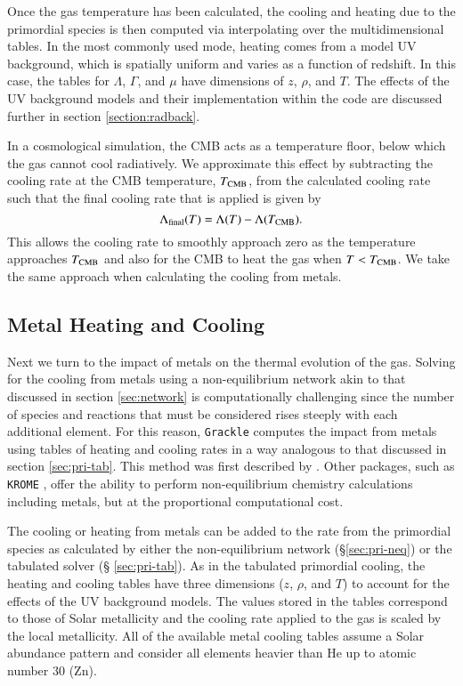 Once the gas temperature has been calculated, the cooling and heating
due to the primordial species is then computed via interpolating over
the multidimensional tables.  In the most commonly used mode, heating
comes from a model UV background, which is spatially uniform and
varies as a function of redshift.  In this case, the tables for
$\Lambda$, $\Gamma$, and $\mu$ have dimensions of $z$, $\rho$, and
$T$.  The effects of the UV background models and their implementation
within the code are discussed further in section
\ref{section:radback}.

In a cosmological simulation, the CMB acts as a temperature floor,
below which the gas cannot cool radiatively.  We approximate this effect by
subtracting the cooling rate at the CMB temperature, $T_{\rm CMB}$, from
the calculated cooling rate such that the final cooling rate that is
applied is given by
\begin{equation}
\Lambda_{\rm final}(T) = \Lambda(T) - \Lambda(T_{\rm CMB}).
\end{equation}
This allows the cooling rate to smoothly approach zero as the
temperature approaches $T_{\rm CMB}$ and also for the CMB to heat the gas
when $T < T_{\rm CMB}$.  We take the same approach when calculating the
cooling from metals.


\subsection{Metal Heating and Cooling}

Next we turn to the impact of metals on the thermal evolution of the gas.
Solving for the cooling from metals using a non-equilibrium network
akin to that discussed in section \ref{sec:network} is computationally
challenging since the number of species and reactions that must be
considered rises steeply with each additional element.  For this
reason, \texttt{Grackle} computes the impact from metals using tables of
heating and cooling rates in a way analogous to that discussed in section
\ref{sec:pri-tab}.  This method was first described by
\citet{2008MNRAS.385.1443S}.  Other packages, such as \texttt{KROME}
\citep{2014MNRAS.439.2386G}, offer the ability to perform
non-equilibrium chemistry calculations including metals, but at the
proportional computational cost.

The cooling or heating from metals can be added to the rate from the
primordial species as calculated by either the non-equilibrium network
(\S \ref{sec:pri-neq}) or the tabulated solver (\S
\ref{sec:pri-tab}).  As in the tabulated primordial cooling, the
heating and cooling tables have three dimensions ($z$, $\rho$, and
$T$) to account for the effects of the UV background models.  The
values stored in the tables correspond to those of Solar metallicity
and the cooling rate applied to the gas is scaled by the local
metallicity.  All of the available metal cooling tables assume a Solar
abundance pattern and consider all elements heavier than He up to
atomic number 30 (Zn).

